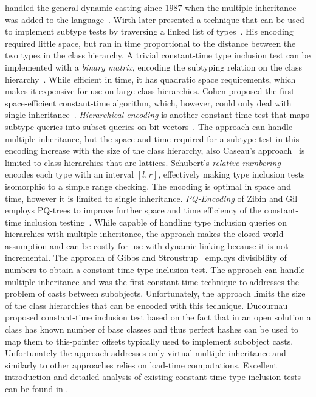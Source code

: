 \Cpp{} handled the general dynamic casting since 1987 when the multiple inheritance 
was added to the language~\cite{Str87}. Wirth later presented a technique that 
can be used to implement subtype tests by traversing a linked list of 
types~\cite{Wirth88}. His encoding required little space, but ran in time 
proportional to the distance between the two types in the class hierarchy. 
A trivial constant-time type inclusion test can be implemented with a 
\emph{binary matrix}, encoding the subtyping relation on the class 
hierarchy~\cite{Vortex96}. While efficient in time, it has quadratic space 
requirements, which makes it expensive for use on large class hierarchies. Cohen 
proposed the first space-efficient constant-time algorithm, which, however, could 
only deal with single inheritance~\cite{Cohen91}. \emph{Hierarchical encoding} 
is another constant-time test that maps subtype queries into subset queries on 
bit-vectors~\cite{Caseau93,Krall97nearoptimal}. The approach can handle multiple
inheritance, but the space and time required for a subtype test in this encoding 
increase with the size of the class hierarchy, also Caseau's approach~\cite{Caseau93} is 
limited to class hierarchies that are lattices. Schubert's \emph{relative 
numbering}~\cite{Schubert83} encodes each type with an interval $[l,r]$, 
effectively making type inclusion tests isomorphic to a simple range checking. 
The encoding is optimal in space and time, however it is limited to single 
inheritance. \emph{PQ-Encoding} of Zibin and Gil employs PQ-trees to improve 
further space and time efficiency of the constant-time inclusion 
testing~\cite{PQEncoding}. While capable of handling type inclusion queries on 
hierarchies with multiple inheritance, the approach makes the closed world assumption and can be costly 
for use with dynamic linking because it is not incremental.
The approach of Gibbs and Stroustrup~\cite{FastDynCast} employs divisibility of 
numbers to obtain a constant-time type inclusion test. The approach can handle 
multiple inheritance and was the first constant-time technique to addresses the 
problem of casts between subobjects. Unfortunately, the approach limits the size 
of the class hierarchies that can be encoded with this technique. 
Ducournau proposed constant-time inclusion test based on the fact that in an 
open solution a class has known number of base classes and thus perfect hashes 
can be used to map them to this-pointer offsets typically used to implement 
subobject casts\cite{Ducournau08}. Unfortunately the approach addresses only 
virtual multiple inheritance and similarly to other approaches relies on 
load-time computations. Excellent introduction and detailed 
analysis of existing constant-time type inclusion tests can be found in 
\cite{Vitek97,PQEncoding}.

